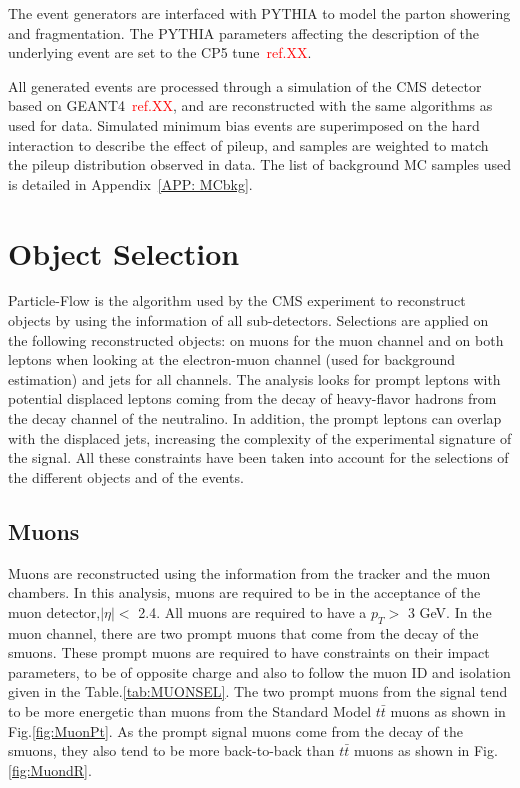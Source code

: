 \documentclass{cernatlasnote}
\begin{document}
The event generators are interfaced with PYTHIA to model the parton showering and fragmentation. The PYTHIA parameters affecting the description of the underlying event are set to the CP5 tune~\textcolor{red}{ref.XX}.

All generated events are processed through a simulation of the CMS detector based on
GEANT4~\textcolor{red}{ref.XX}, and are reconstructed with the same algorithms as used for data. Simulated
minimum bias events are superimposed on the hard interaction to describe the effect of pileup,
and samples are weighted to match the pileup distribution observed in data. 
\newline \smallskip
The list of background MC samples used is detailed in Appendix~\ref{APP: MCbkg}. 

\section{Object Selection}
\label{SEC: OBJSEL}

Particle-Flow \cite{CMS:2017yfk} is the algorithm used by the CMS experiment to reconstruct objects by using the information of all sub-detectors. Selections are applied on the following reconstructed objects: on muons for the muon channel and on both leptons when looking at the electron-muon channel (used for background estimation) and jets for all channels. The analysis looks for prompt leptons with potential displaced leptons coming from the decay of heavy-flavor hadrons from the decay channel of the neutralino. In addition, the prompt leptons can overlap with the displaced jets, increasing the complexity of the experimental signature of the signal. All these constraints have been taken into account for the selections of the different objects and of the events.

\subsection{Muons}
Muons are reconstructed using the information from the tracker and the muon chambers. In this analysis, muons are required to be in the acceptance of the muon detector,$|\eta| <$ 2.4. All muons are required to have a $p_T > $  3 GeV. In the muon channel, there are two prompt muons that come from the decay of the smuons. These prompt muons are required to have constraints on their impact parameters, to be of opposite charge and also to follow the muon ID and isolation given in the Table.\ref{tab:MUONSEL}. The two prompt muons from the signal tend to be more energetic than muons from the Standard Model $t\bar{t}$ muons as shown in Fig.\ref{fig:MuonPt}. As the prompt signal muons come from the decay of the smuons, they also tend to be more back-to-back than $t\bar{t}$ muons as shown in Fig.\ref{fig:MuondR}.
\end{document}
